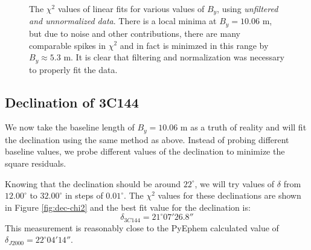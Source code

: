 \documentclass[12pt]{article}
\begin{document}
\begin{figure}[H]
\caption[SODUMB]{The $\chi^2$ values of linear fits for various values of $B_y$, using \textit{unfiltered and unnormalized data}. There is a local minima at $B_y=10.06$ m, but due to noise and other contributions, there are many comparable spikes in $\chi^2$ and in fact is minimzed in this range by $B_y \approx 5.3$ m. It is clear that filtering and normalization was necessary to properly fit the data.}
\label{fig:bad-chi2}
\end{figure}

\subsection{Declination of 3C144}
We now take the baseline length of $B_y = 10.06$ m as a truth of reality and will fit the declination using the same method as above. Instead of probing different baseline values, we probe different values of the declination to minimize the square residuals.

Knowing that the declination should be around $22^\circ$, we will try values of $\delta$ from $12.00^\circ$ to $32.00^\circ$ in steps of $0.01^\circ$. The $\chi^2$ values for these declinations are shown in Figure \ref{fig:dec-chi2} and the best fit value for the declination is:
\begin{equation}
\delta_{3C144} = 21^\circ 07'26.8''
\end{equation}
This measurement is reasonably close to the PyEphem calculated value of $\delta_{J2000} = 22^\circ 04'14'' $. 
\end{document}
